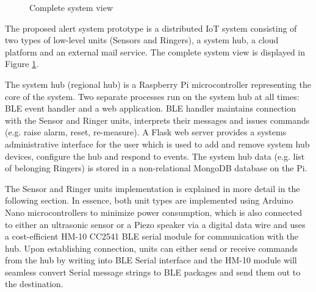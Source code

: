 \documentclass[conference]{IEEEtran}
\begin{document}
\begin{figure}[!htb]
	\caption{\label{fig:complete-view} Complete system view}
\end{figure}

The proposed alert system prototype is a distributed IoT system consisting of two types of low-level units (Sensors and Ringers), a system hub, a cloud platform and an external mail service. The complete system view is displayed in Figure \ref{fig:complete-view}. 

The system hub (regional hub) is a Raspberry Pi microcontroller representing the core of the system. Two separate processes run on the system hub at all times: BLE event handler and a web application. BLE handler maintains connection with the Sensor and Ringer units, interprets their messages and issues commands (e.g. raise alarm, reset, re-measure). A Flask web server provides a systems administrative interface for the user which is used to add and remove system hub devices, configure the hub and respond to events. The system hub data (e.g. list of belonging Ringers) is stored in a non-relational MongoDB database on the Pi.

The Sensor and Ringer units implementation is explained in more detail in the following section. In essence, both unit types are implemented using Arduino Nano microcontrollers to minimize power consumption, which is also connected to either an ultrasonic sensor or a Piezo speaker via a digital data wire and uses a cost-efficient HM-10 CC2541 BLE serial module for communication with the hub. Upon establishing connection, units can either send or receive commands from the hub by writing into BLE Serial interface and the HM-10 module will seamless convert Serial message strings to BLE packages and send them out to the destination.
\end{document}

